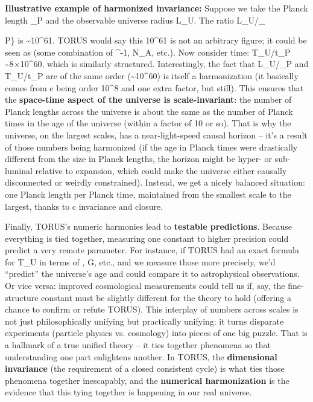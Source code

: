 \documentclass[
]{article}
\begin{document}
\textbf{Illustrative example of harmonized invariance:} Suppose we take
the Planck length
\ell_{P}{} and the
observable universe radius
L_{U}. The ratio
L_{U}/\ell_{P\}
is \textasciitilde10\^{}61. TORUS would say this 10\^{}61 is not an
arbitrary figure; it could be seen as (some combination of \alpha\^{}-1,
N_{A}, etc.). Now
consider time:
T_{U}/t_{P}{}
\textasciitilde8×10\^{}60, which is similarly structured. Interestingly,
the fact that
L_{U}/\ell_{P}{}
and
T_{U}/t_{P}{}
are of the same order (\textasciitilde10\^{}60) is itself a
harmonization (it basically comes from c being order 10\^{}8 and one
extra factor, but still). This ensures that the \textbf{space-time
aspect of the universe is scale-invariant}: the number of Planck lengths
across the universe is about the same as the number of Planck times in
the age of the universe (within a factor of 10 or so). That is why the
universe, on the largest scales, has a near-light-speed causal horizon
-- it's a result of those numbers being harmonized (if the age in Planck
times were drastically different from the size in Planck lengths, the
horizon might be hyper- or sub-luminal relative to expansion, which
could make the universe either causally disconnected or weirdly
constrained). Instead, we get a nicely balanced situation: one Planck
length per Planck time, maintained from the smallest scale to the
largest, thanks to c invariance and closure\hspace{0pt}.

Finally, TORUS's numeric harmonies lead to \textbf{testable
predictions}. Because everything is tied together, measuring one
constant to higher precision could predict a very remote parameter. For
instance, if TORUS had an exact formula for
T_{U}{} in terms of \alpha,
G, etc., and we measure those more precisely, we'd ``predict'' the
universe's age and could compare it to astrophysical observations. Or
vice versa: improved cosmological measurements could tell us if, say,
the fine-structure constant must be slightly different for the theory to
hold (offering a chance to confirm or refute TORUS). This interplay of
numbers across scales is not just philosophically unifying but
practically unifying: it turns disparate experiments (particle physics
vs. cosmology) into pieces of one big puzzle. That is a hallmark of a
true unified theory -- it ties together phenomena so that understanding
one part enlightens another. In TORUS, the \textbf{dimensional
invariance} (the requirement of a closed consistent cycle) is what ties
those phenomena together inescapably, and the \textbf{numerical
harmonization} is the evidence that this tying together is happening in
our real universe\hspace{0pt}.

}
\end{document}
